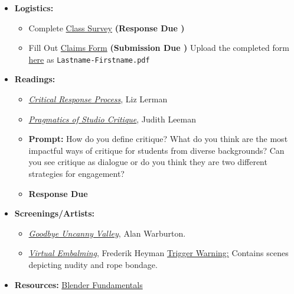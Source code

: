 \begin{itemize}[noitemsep,topsep=0pt,leftmargin=*]
      \item \textbf{Logistics:}
                  \begin{itemize}
                        \item Complete \href{https://forms.gle/RnFhT6QbLLC9UYqm7}{Class Survey} \textbf{(Response Due \dFri)}
                        \item Fill Out \href{https://drive.google.com/file/d/1SeksTmFmQa6uehrmoSIL_uO8tuORo0P3/view}{Claims Form} \textbf{(Submission Due \dFri)}
                              \newline Upload the completed form \href{https://osu.app.box.com/f/21e679a1efd4425b869edf8df0c4c77a}{here} as \texttt{Lastname-Firstname.pdf}
                  \end{itemize}
            \item \textbf{Readings:}
                  \begin{itemize}
                        \item \emph{\href{https://drive.google.com/file/d/1tnvKJBaXn2kFXjp-KB8p0_dkKuw1R4fu/view?usp=sharing}{Critical Response Process}}, Liz Lerman
                        \item \emph{\href{https://drive.google.com/file/d/1vUej0gK5nckVl6hvf68lcHJrh1w73h12/view?usp=sharing}{Pragmatics of Studio Critique}}, Judith Leeman
                        \item \textbf{Prompt:} How do you define critique? What do you think are the most impactful ways of critique for students from diverse backgrounds? Can you see critique as dialogue or do you think they are two different strategies for engagement?
                        \item \textbf{Response Due \dThur}
                  \end{itemize}
            \item \textbf{Screenings/Artists:}
            \begin{itemize}
                  \item \href{https://alanwarburton.co.uk/goodbye-uncanny-valley}{\emph{Goodbye Uncanny Valley}}, Alan Warburton.
                  \item \href{https://www.nowness.com/story/virtual-embalming-frederik-heyman}{\emph{Virtual Embalming}}, Frederik Heyman \newline
                  \small{\ul{Trigger Warning:} Contains scenes depicting nudity and rope bondage.}
            \end{itemize} 
            \item \textbf{Resources:} \href{https://cloud.blender.org/p/blender-fundamentals/}{Blender Fundamentals}
\end{itemize}